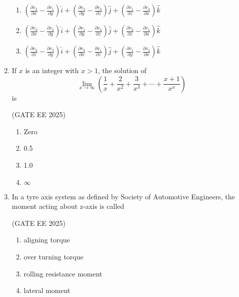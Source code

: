 \documentclass[journal,12pt,onecolumn]{IEEEtran}
\theoremstyle{remark}
\begin{document}
\begin{enumerate}
\begin{multicols}{2}
\begin{enumerate}
\item $\left(\frac{\partial v_{2}}{\partial x} - \frac{\partial v_{1}}{\partial y}\right)\hat{i}
+ \left(\frac{\partial v_{3}}{\partial y} - \frac{\partial v_{2}}{\partial z}\right)\hat{j}
+ \left(\frac{\partial v_{1}}{\partial z} - \frac{\partial v_{3}}{\partial x}\right)\hat{k}$

\item $\left(\frac{\partial v_{3}}{\partial x} - \frac{\partial v_{2}}{\partial y}\right)\hat{i}
+ \left(\frac{\partial v_{1}}{\partial y} - \frac{\partial v_{3}}{\partial z}\right)\hat{j}
+ \left(\frac{\partial v_{2}}{\partial z} - \frac{\partial v_{1}}{\partial x}\right)\hat{k}$

\item $\left(\frac{\partial v_{2}}{\partial z} - \frac{\partial v_{3}}{\partial y}\right)\hat{i}
+ \left(\frac{\partial v_{3}}{\partial x} - \frac{\partial v_{1}}{\partial z}\right)\hat{j}
+ \left(\frac{\partial v_{1}}{\partial y} - \frac{\partial v_{2}}{\partial x}\right)\hat{k}$
\end{enumerate}
\end{multicols}

\item If $x$ is an integer with $x > 1$, the solution of  
\[
\lim_{x\to\infty}\left(\frac{1}{x}+\frac{2}{x^2}+\frac{3}{x^3}+\cdots+\frac{x+1}{x^{x}}\right)
\]
is

\hfill(GATE EE 2025)

\begin{multicols}{4}
\begin{enumerate}
\item Zero
\item 0.5
\item 1.0
\item $\infty$
\end{enumerate}
\end{multicols}

\item In a tyre axis system as defined by Society of Automotive Engineers, the
moment acting about z-axis is called

\hfill(GATE EE 2025)

\begin{multicols}{2}
\begin{enumerate}
\item aligning torque
\item over turning torque
\item rolling resistance moment
\item lateral moment
\end{enumerate}
\end{multicols}


\end{enumerate}
\end{document}

